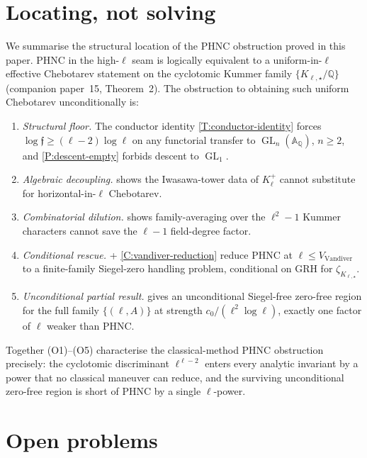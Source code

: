\documentclass[11pt]{article}
\newcommand{\Q}{\mathbb Q}
\newcommand{\A}{\mathbb A}
\newcommand{\GL}{\operatorname{GL}}
\begin{document}
\section{Locating, not solving}

We summarise the structural location of the PHNC obstruction proved in this paper.  PHNC in the high-\(\ell\) seam is logically equivalent to a uniform-in-\(\ell\) effective Chebotarev statement on the cyclotomic Kummer family \(\{K_{\ell,\star}/\Q\}\) (companion paper~15, Theorem~2).  The obstruction to obtaining such uniform Chebotarev unconditionally is:

\begin{enumerate}[leftmargin=2em,label=(O\arabic*)]
\item \emph{Structural floor.}  The conductor identity \cref{T:conductor-identity} forces \(\log\mathfrak f\ge(\ell-2)\log\ell\) on any functorial transfer to \(\GL_n(\A_\Q)\), \(n\ge 2\), and \cref{P:descent-empty} forbids descent to \(\GL_1\).
\item \emph{Algebraic decoupling.}   shows the Iwasawa-tower data of \(K_\ell^+\) cannot substitute for horizontal-in-\(\ell\) Chebotarev.
\item \emph{Combinatorial dilution.}   shows family-averaging over the \(\ell^2-1\) Kummer characters cannot save the \(\ell-1\) field-degree factor.
\item \emph{Conditional rescue.}   + \cref{C:vandiver-reduction} reduce PHNC at \(\ell\le V_{\mathrm{Vandiver}}\) to a finite-family Siegel-zero handling problem, conditional on GRH for \(\zeta_{K_{\ell,\star}}\).
\item \emph{Unconditional partial result.}   gives an unconditional Siegel-free zero-free region for the full family \(\{(\ell,A)\}\) at strength \(c_0/(\ell^2\log\ell)\), exactly one factor of \(\ell\) weaker than PHNC.
\end{enumerate}

Together (O1)--(O5) characterise the classical-method PHNC obstruction precisely: the cyclotomic discriminant \(\ell^{\ell-2}\) enters every analytic invariant by a power that no classical maneuver can reduce, and the surviving unconditional zero-free region is short of PHNC by a single \(\ell\)-power.

\section{Open problems}
\end{document}

